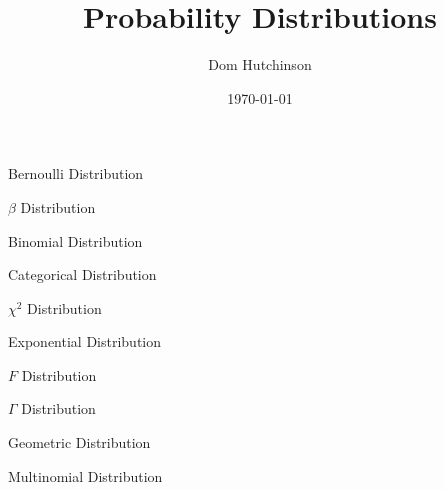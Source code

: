 \documentclass[11pt,a4paper]{article}
\begin{document}
\title{Probability Distributions}
\author{Dom Hutchinson}
\date{\today}
\maketitle

%

\begin{definition}{Bernoulli Distribution}
\end{definition}

\begin{definition}{$\beta$ Distribution}

\end{definition}

\begin{definition}{Binomial Distribution}

\end{definition}

\begin{definition}{Categorical Distribution}

\end{definition}

\begin{definition}{$\chi^2$ Distribution}

\end{definition}

\begin{definition}{Exponential Distribution}

\end{definition}

\begin{definition}{$F$ Distribution}

\end{definition}

\begin{definition}{$\Gamma$ Distribution}

\end{definition}

\begin{definition}{Geometric Distribution}

\end{definition}

\begin{definition}{Multinomial Distribution}

\end{definition}
\end{document}
